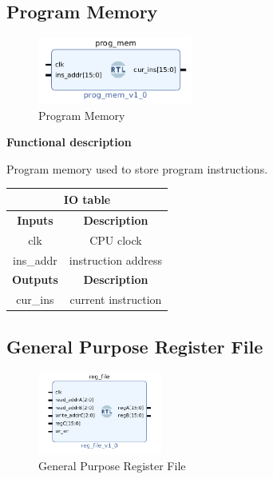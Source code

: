 \documentclass{article}
\begin{document}
\begin{par}
	\subsection{Program Memory}
	
	\begin{figure}[H]
		\centering
		\includegraphics[width=2in]{img/progMem.png}
		\caption{Program Memory}
	\end{figure}
	
	\textbf{Functional description}
	\begin{par}
		Program memory used to store program instructions. 
	\end{par}
	
	\begin{center}
		\begin{tabular}{|c|c|}
			\hline 
			\multicolumn{2}{|c|}{\textbf{IO table}} \\
			\hline 
			\textbf{Inputs} & \textbf{Description} \\ 
			\hline 
			clk & CPU clock \\ 
			\hline 
			ins\_addr & instruction address \\ 
			\hline 
			\textbf{Outputs} & \textbf{Description} \\ 
			\hline 
			cur\_ins & current instruction \\
			\hline
		\end{tabular}
	\end{center}

	\subsection{General Purpose Register File}
	
	\begin{figure}[H]
		\centering
		\includegraphics[width=1.6in]{img/regFile.png}
		\caption{General Purpose Register File}
	\end{figure}
	

\end{par}
\end{document}
